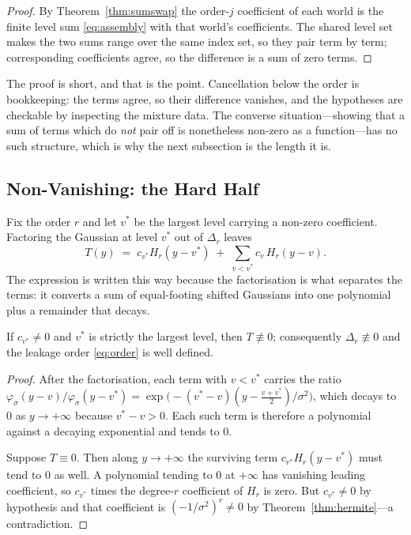\begin{proof}
By Theorem~\ref{thm:sumswap} the order-$j$ coefficient of each world is the finite level sum
\eqref{eq:assembly} with that world's coefficients. The shared level set makes the two sums
range over the same index set, so they pair term by term; corresponding coefficients agree,
so the difference is a sum of zero terms.
\end{proof}


The proof is short, and that is the point. Cancellation below the order is bookkeeping: the
terms agree, so their difference vanishes, and the hypotheses are checkable by inspecting
the mixture data. The converse situation---showing that a sum of terms which do \emph{not}
pair off is nonetheless non-zero as a function---has no such structure, which is why the next
subsection is the length it is.

\subsection{Non-Vanishing: the Hard Half}
\label{sec:nonvanish}

Fix the order $r$ and let $v^{*}$ be the largest level carrying a non-zero coefficient.
Factoring the Gaussian at level $v^{*}$ out of $\Delta_{r}$ leaves
\begin{equation}
T(y)\;=\;c_{v^{*}}H_{r}(y-v^{*})\;+\;\sum_{v<v^{*}}c_{v}\,H_{r}(y-v).
\label{eq:nonvanish}
\end{equation}
The expression is written this way because the factorisation is what separates the terms: it
converts a sum of equal-footing shifted Gaussians into one polynomial plus a remainder that
decays.

\begin{theorem}
\label{thm:nonvanish}
If $c_{v^{*}}\neq0$ and $v^{*}$ is strictly the largest level, then $T\not\equiv0$;
consequently $\Delta_{r}\not\equiv0$ and the leakage order \eqref{eq:order} is well defined.
\end{theorem}

\begin{proof}
After the factorisation, each term with $v<v^{*}$ carries the ratio
$\varphi_{\sigma}(y-v)/\varphi_{\sigma}(y-v^{*})
=\exp\bigl(-(v^{*}-v)(y-\tfrac{v+v^{*}}{2})/\sigma^{2}\bigr)$, which decays to $0$ as
$y\to+\infty$ because $v^{*}-v>0$. Each such term is therefore a polynomial against a
decaying exponential and tends to $0$.

Suppose $T\equiv0$. Then along $y\to+\infty$ the surviving term $c_{v^{*}}H_{r}(y-v^{*})$
must tend to $0$ as well. A polynomial tending to $0$ at $+\infty$ has vanishing leading
coefficient, so $c_{v^{*}}$ times the degree-$r$ coefficient of $H_{r}$ is zero. But
$c_{v^{*}}\neq0$ by hypothesis and that coefficient is $(-1/\sigma^{2})^{r}\neq0$ by
Theorem~\ref{thm:hermite}---a contradiction.
\end{proof}

